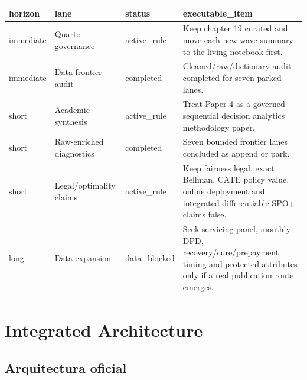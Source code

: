 \documentclass[
  spanish,
  11pt,
  letterpaper,
]{scrbook}
\newcounter{none} %
\theoremstyle{plain}
\theoremstyle{remark}
\begin{document}
{\def\LTcaptype{none} %
\begin{longtable}[]{@{}
  >{\raggedright\arraybackslash}p{}
  >{\raggedright\arraybackslash}p{}
  >{\raggedright\arraybackslash}p{}
  >{\raggedright\arraybackslash}p{}@{}}
\toprule\noalign{}
\begin{minipage}[b]{\linewidth}\raggedright
horizon
\end{minipage} & \begin{minipage}[b]{\linewidth}\raggedright
lane
\end{minipage} & \begin{minipage}[b]{\linewidth}\raggedright
status
\end{minipage} & \begin{minipage}[b]{\linewidth}\raggedright
executable\_item
\end{minipage} \\
\midrule\noalign{}
\endhead
\bottomrule\noalign{}
\endlastfoot
immediate & Quarto governance & active\_rule & Keep chapter 19 curated
and move each new wave summary to the living notebook first. \\
immediate & Data frontier audit & completed & Cleaned/raw/dictionary
audit completed for seven parked lanes. \\
short & Academic synthesis & active\_rule & Treat Paper 4 as a governed
sequential decision analytics methodology paper. \\
short & Raw-enriched diagnostics & completed & Seven bounded frontier
lanes concluded as append or park. \\
short & Legal/optimality claims & active\_rule & Keep fairness legal,
exact Bellman, CATE policy value, online deployment and integrated
differentiable SPO+ claims false. \\
long & Data expansion & data\_blocked & Seek servicing panel, monthly
DPD, recovery/cure/prepayment timing and protected attributes only if a
real publication route emerges. \\
\end{longtable}
}

\chapter{Integrated Architecture}\label{integrated-architecture}

\section{Arquitectura oficial}\label{arquitectura-oficial}
\end{document}
